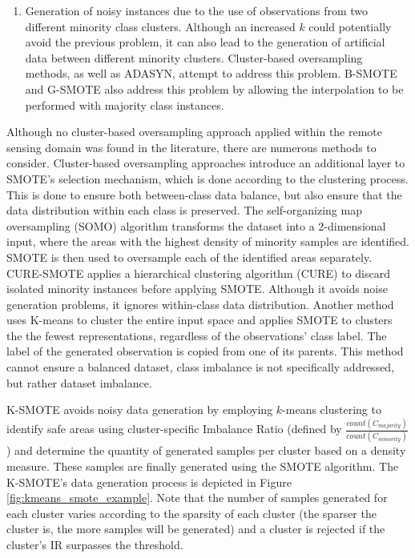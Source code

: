 \documentclass[parskip=full]{scrartcl}
\begin{document}
\begin{enumerate}
	\item Generation of noisy instances due to the use of observations from two different
	      minority class clusters. Although an increased $k$ could
	      potentially avoid the previous problem, it can also lead to the generation of
	      artificial data between different minority clusters. Cluster-based oversampling
	      methods, as well as ADASYN, attempt to address this problem. B-SMOTE
	      \cite{Han2005} and G-SMOTE also address this problem by allowing the
	      interpolation to be performed with majority class instances.
\end{enumerate}

Although no cluster-based oversampling approach applied within the remote
sensing domain was found in the literature, there are numerous methods to
consider. Cluster-based oversampling approaches introduce an additional layer
to SMOTE's selection mechanism, which is done according to the clustering
process. This is done to ensure both between-class data balance, but also
ensure that the data distribution within each class is preserved. The
self-organizing map oversampling (SOMO) \cite{Douzas2017} algorithm
transforms the dataset into a 2-dimensional input, where the areas with the
highest density of minority samples are identified. SMOTE is then used to
oversample each of the identified areas separately. CURE-SMOTE
\cite{Ma2017} applies a hierarchical clustering algorithm (CURE) to
discard isolated minority instances before applying SMOTE. Although it avoids
noise generation problems, it ignores within-class data distribution. Another
method \cite{Santos2015} uses K-means to cluster the entire input space
and applies SMOTE to clusters the the fewest representations, regardless of the
observations' class label. The label of the generated observation is copied
from one of its parents. This method cannot ensure a balanced dataset, class
imbalance is not specifically addressed, but rather dataset imbalance.

K-SMOTE \cite{Douzas2018} avoids noisy data generation by employing
$k$-means clustering to identify safe areas using
cluster-specific Imbalance Ratio (defined by $\frac{count(C_{majority})}{count(C_{minority})}$) and
determine the quantity of generated samples per cluster based on a density
measure. These samples are finally generated using the SMOTE algorithm. The
K-SMOTE's data generation process is depicted in Figure \ref{fig:kmeans_smote_example}.
Note that the number of samples generated for each cluster varies according to
the sparsity of each cluster (the sparser the cluster is, the more samples will
be generated) and a cluster is rejected if the cluster's IR surpasses the
threshold.
\end{document}
